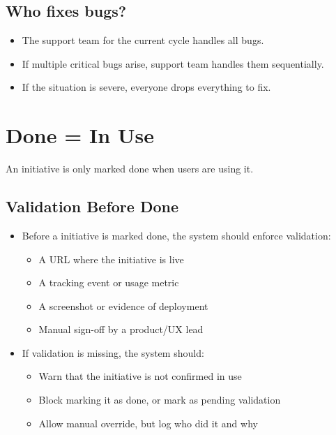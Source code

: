 \documentclass[a4paper]{article}
\begin{document}
\subsection*{Who fixes bugs?}

\begin{itemize}
    \item The support team for the current cycle handles all bugs.
    \item If multiple critical bugs arise, support team handles them sequentially.
    \item If the situation is severe, everyone drops everything to fix.
\end{itemize}

\section{Done = In Use}

An initiative is only marked done when users are using it.

\subsection*{Validation Before Done}

\begin{itemize}
    \item Before a initiative is marked done, the system should enforce validation:
    \begin{itemize}
        \item A URL where the initiative is live
        \item A tracking event or usage metric
        \item A screenshot or evidence of deployment
        \item Manual sign-off by a product/UX lead
    \end{itemize}

    \item If validation is missing, the system should:

    \begin{itemize}
        \item Warn that the initiative is not confirmed in use
        \item Block marking it as done, or mark as pending validation
        \item Allow manual override, but log who did it and why
    \end{itemize}

\end{itemize}
\end{document}
